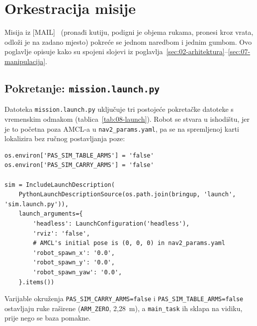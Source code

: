 \section{Orkestracija misije}
\label{sec:08-misija}

Misija iz [MAIL]~\cite{mail2026} (pronađi kutiju, podigni je objema rukama, pronesi kroz vrata, odloži
je na zadano mjesto) pokreće se jednom naredbom i jednim gumbom. Ovo poglavlje opisuje kako su
spojeni slojevi iz poglavlja~\ref{sec:02-arhitektura}--\ref{sec:07-manipulacija}.

\subsection{Pokretanje: \texttt{mission.launch.py}}
\label{sec:08-launch}

Datoteka \texttt{mission.launch.py} uključuje tri postojeće pokretačke datoteke s vremenskim odmakom
(tablica~\ref{tab:08-launch}). Robot se stvara u ishodištu, jer je to početna poza AMCL-a u
\texttt{nav2\_params.yaml}, pa se na spremljenoj karti lokalizira bez ručnog postavljanja poze:

\begin{lstlisting}[style=code-python, caption={Ulazak u simulaciju iz \texttt{mission.launch.py} (redci 31--47): ruke ostaju raširene do sklapanja na vidiku, spawn na AMCL-ovu početnu pozu}, label={lst:mission-launch}]
os.environ['PAS_SIM_TABLE_ARMS'] = 'false'
os.environ['PAS_SIM_CARRY_ARMS'] = 'false'

sim = IncludeLaunchDescription(
    PythonLaunchDescriptionSource(os.path.join(bringup, 'launch', 'sim.launch.py')),
    launch_arguments={
        'headless': LaunchConfiguration('headless'),
        'rviz': 'false',
        # AMCL's initial pose is (0, 0, 0) in nav2_params.yaml
        'robot_spawn_x': '0.0',
        'robot_spawn_y': '0.0',
        'robot_spawn_yaw': '0.0',
    }.items())
\end{lstlisting}

Varijable okruženja \texttt{PAS\_SIM\_CARRY\_ARMS=false} i \texttt{PAS\_SIM\_TABLE\_ARMS=false}
ostavljaju ruke raširene (\texttt{ARM\_ZERO}, 2{,}28~m), a \texttt{main\_task} ih sklapa na vidiku,
prije nego se baza pomakne.

